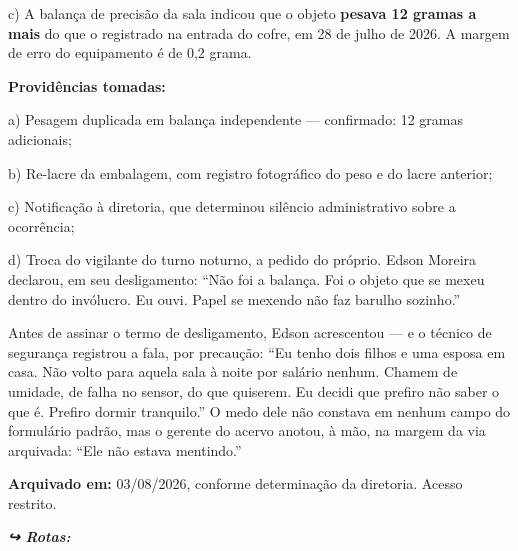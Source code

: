 \noindent c) A balança de precisão da sala indicou que o objeto \textbf{pesava 12 gramas a mais} do que o registrado na entrada do cofre, em 28 de julho de 2026. A margem de erro do equipamento é de 0,2 grama.

\noindent \textbf{Providências tomadas:}

\noindent a) Pesagem duplicada em balança independente --- confirmado: 12 gramas adicionais;

\noindent b) Re-lacre da embalagem, com registro fotográfico do peso e do lacre anterior;

\noindent c) Notificação à diretoria, que determinou silêncio administrativo sobre a ocorrência;

\noindent d) Troca do vigilante do turno noturno, a pedido do próprio. Edson Moreira declarou, em seu desligamento: \textquotedblleft{}Não foi a balança. Foi o objeto que se mexeu dentro do invólucro. Eu ouvi. Papel se mexendo não faz barulho sozinho.\textquotedblright{}

\noindent Antes de assinar o termo de desligamento, Edson acrescentou --- e o técnico de segurança registrou a fala, por precaução: \textquotedblleft{}Eu tenho dois filhos e uma esposa em casa. Não volto para aquela sala à noite por salário nenhum. Chamem de umidade, de falha no sensor, do que quiserem. Eu decidi que prefiro não saber o que é. Prefiro dormir tranquilo.\textquotedblright{} O medo dele não constava em nenhum campo do formulário padrão, mas o gerente do acervo anotou, à mão, na margem da via arquivada: \textquotedblleft{}Ele não estava mentindo.\textquotedblright{}

\noindent \textbf{Arquivado em:} 03/08/2026, conforme determinação da diretoria. Acesso restrito.

\vspace{0.5em}
\noindent\textit{\textbf{↪ Rotas:}  \rotasep {} \rotasep {}}
